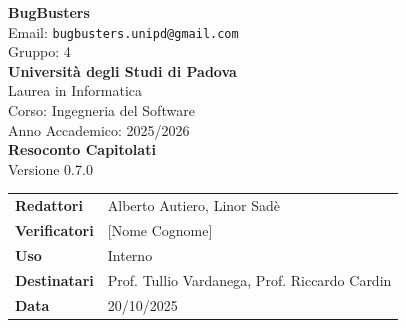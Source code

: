 \documentclass[a4paper,11pt]{article}
\newcommand{\CurrentVersion}{0.7.0} %
\begin{document}
\pagestyle{fancy}
\fancyhf{} %


\fancyfoot[R]{ \nouppercase{\rightmark}} %


\renewcommand{\headrulewidth}{0pt}  %
\renewcommand{\footrulewidth}{0pt}  %


\begin{center}
  \thispagestyle{empty}
  {\Large\bfseries BugBusters}\\[0.3cm]
  {\small\color{darkgray} Email: \texttt{bugbusters.unipd@gmail.com}} \\[0.1cm]
  {\small\color{darkgray} Gruppo: 4} \\[0.5cm]

  {\large\bfseries Università degli Studi di Padova}\\[0.3cm]
  {\small Laurea in Informatica}\\[0.2cm]
  {\small Corso: Ingegneria del Software}\\[0.2cm]
  {\small Anno Accademico: 2025/2026}\\[0.8cm]

  {\Huge\bfseries\color{primaryblue} Resoconto Capitolati}\\[0.8cm]
  {\Large\color{secondaryblue}Versione \CurrentVersion}\\[0.8cm]
\end{center}

\begin{center}
\begin{tcolorbox}[colback=lightgray,colframe=primaryblue,width=0.85\textwidth,arc=3mm,boxrule=0.5pt]
\begin{tabular}{@{}ll@{}}
\textbf{Redattori}    & Alberto Autiero, Linor Sadè\\
\textbf{Verificatori} & [Nome Cognome] \\
\textbf{Uso}          & Interno \\
\textbf{Destinatari}  & Prof. Tullio Vardanega, Prof. Riccardo Cardin \\
\textbf{Data}         & 20/10/2025 \\
\end{tabular}
\end{tcolorbox}
\end{center}
\end{document}
